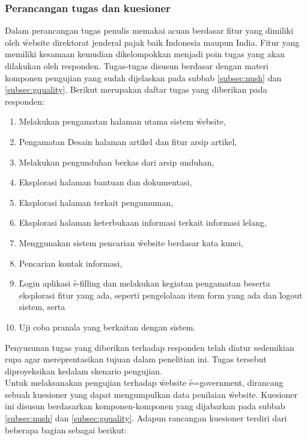 \subsubsection{Perancangan tugas dan kuesioner}
Dalam perancangan tugas penulis memakai acuan berdasar fitur yang dimiliki oleh \f{website} direktorat jenderal pajak baik Indonesia maupun India. Fitur yang memiliki kesamaan kemudian dikelompokkan menjadi poin tugas yang akan dilakukan oleh responden. Tugas-tugas disusun berdasar dengan materi komponen pengujian yang sudah dijelaskan pada subbab \ref{subsec:nush} dan \ref{subsec:gquality}.
Berikut merupakan daftar tugas yang diberikan pada responden:
\begin{enumerate}
	\item Melakukan pengamatan halaman utama sistem \f{website},
	\item Pengamatan Desain halaman artikel dan fitur arsip artikel,
	\item Melakukan pengunduhan berkas dari arsip unduhan,
	\item Eksplorasi halaman bantuan dan dokumentasi,
	\item Eksplorasi halaman terkait pengumuman,
	\item Eksplorasi halaman keterbukaan informasi terkait informasi lelang,
	\item Menggunakan sistem pencarian \f{website} berdasar kata kunci,
	\item Pencarian kontak informasi,
	\item \f{Login} aplikasi \f{e-filling} dan melakukan kegiatan pengamatan beserta eksplorasi fitur yang ada, seperti pengelolaan item form yang ada dan \f{logout} sistem, serta
	\item Uji coba pranala yang berkaitan dengan sistem.
\end{enumerate}
Penyusunan tugas yang diberikan terhadap responden telah diatur sedemikian rupa agar mereprentasikan tujuan dalam penelitian ini. Tugas tersebut diproyeksikan kedalam skenario pengujian.
\newline\\
Untuk melaksanakan pengujian terhadap \f{website} \f{e=government}, dirancang sebuah kuesioner yang dapat mengumpulkan data penilaian \f{website}. Kuesioner ini disusun berdasarkan komponen-komponen yang dijabarkan pada subbab \ref{subsec:nush} dan \ref{subsec:gquality}. Adapun rancangan kuesioner \ust \space terdiri dari beberapa bagian sebagai berikut:
